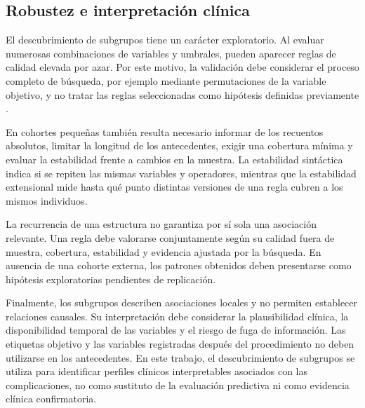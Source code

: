\subsection{Robustez e interpretación clínica}

El descubrimiento de subgrupos tiene un carácter exploratorio. Al evaluar numerosas combinaciones de variables y umbrales, pueden aparecer reglas de calidad elevada por azar. Por este motivo, la validación debe considerar el proceso completo de búsqueda, por ejemplo mediante permutaciones de la variable objetivo, y no tratar las reglas seleccionadas como hipótesis definidas previamente \cite{Duivesteijn2011}.

En cohortes pequeñas también resulta necesario informar de los recuentos absolutos, limitar la longitud de los antecedentes, exigir una cobertura mínima y evaluar la estabilidad frente a cambios en la muestra. La estabilidad sintáctica indica si se repiten las mismas variables y operadores, mientras que la estabilidad extensional mide hasta qué punto distintas versiones de una regla cubren a los mismos individuos.

La recurrencia de una estructura no garantiza por sí sola una asociación relevante. Una regla debe valorarse conjuntamente según su calidad fuera de muestra, cobertura, estabilidad y evidencia ajustada por la búsqueda. En ausencia de una cohorte externa, los patrones obtenidos deben presentarse como hipótesis exploratorias pendientes de replicación.

Finalmente, los subgrupos describen asociaciones locales y no permiten establecer relaciones causales. Su interpretación debe considerar la plausibilidad clínica, la disponibilidad temporal de las variables y el riesgo de fuga de información. Las etiquetas objetivo y las variables registradas después del procedimiento no deben utilizarse en los antecedentes. En este trabajo, el descubrimiento de subgrupos se utiliza para identificar perfiles clínicos interpretables asociados con las complicaciones, no como sustituto de la evaluación predictiva ni como evidencia clínica confirmatoria.
